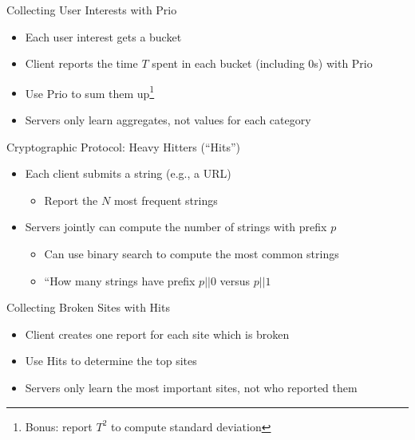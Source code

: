 \documentclass[helvetica]{beamer}
\begin{document}
\begin{frame}{Collecting User Interests with Prio}

  \begin{itemize}
  \item Each user interest gets a bucket
  \item Client reports the time $T$ spent in each bucket (including 0s) with Prio
  \item Use Prio to sum them up\footnote{Bonus: report $T^2$ to compute standard deviation}
  \item Servers only learn aggregates, not values for each category
  \end{itemize}
\end{frame}


\begin{frame}{Cryptographic Protocol: Heavy Hitters (``Hits'') ~\cite{cryptoeprint:2021:017}}

  \begin{itemize}
  \item Each client submits a string (e.g., a URL)
    \begin{itemize}
    \item Report the $N$ most frequent strings
    \end{itemize}

  \item Servers jointly can compute the number of strings with prefix $p$
    \begin{itemize}
    \item Can use binary search to compute the most common strings
    \item ``How many strings have prefix $p || 0$ versus $p || 1$
    \end{itemize}
  \end{itemize}

\end{frame}

\begin{frame}{Collecting Broken Sites with Hits}

  \begin{itemize}
  \item Client creates one report for each site which is broken
  \item Use Hits to determine the top sites
  \item Servers only learn the most important sites, not who reported them
  \end{itemize}

\end{frame}
\end{document}
